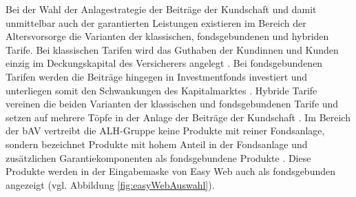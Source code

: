 Bei der Wahl der Anlagestrategie der Beiträge der Kundschaft und damit unmittelbar auch der garantierten Leistungen existieren im Bereich der Altersvorsorge die Varianten der klassischen, fondsgebundenen und hybriden Tarife. Bei klassischen Tarifen wird das Guthaben der Kundinnen und Kunden einzig im Deckungskapital des Versicherers angelegt \cite{alh_produkte}. Bei fondsgebundenen Tarifen werden die Beiträge hingegen in Investmentfonds investiert und unterliegen somit den Schwankungen des Kapitalmarktes \cite{alh_produkte}. Hybride Tarife vereinen die beiden Varianten der klassischen und fondsgebundenen Tarife und setzen auf mehrere Töpfe in der Anlage der Beiträge der Kundschaft \cite{alh_produkte}. Im Bereich der bAV vertreibt die ALH-Gruppe keine Produkte mit reiner Fondsanlage, sondern bezeichnet Produkte mit hohem Anteil in der Fondsanlage und zusätzlichen Garantiekomponenten als fondsgebundene Produkte \cite{alh_produkte}. Diese Produkte werden in der Eingabemaske von Easy Web auch als fondsgebunden angezeigt (vgl. Abbildung \ref{fig:easyWebAuswahl}). 

